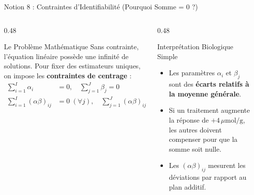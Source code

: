 \documentclass[aspectratio=169,10pt]{beamer}
\begin{document}
\begin{frame}{Notion 8 : Contraintes d'Identifiabilité (Pourquoi Somme = 0 ?)}
  \begin{columns}[onlytextwidth, T]
    \begin{column}{0.48\linewidth}
      \begin{conceptbox}{Le Problème Mathématique}
        Sans contrainte, l'équation linéaire possède une infinité de solutions. Pour fixer des estimateurs uniques, on impose les \textbf{contraintes de centrage} :
        \begin{align*}
          \sum_{i=1}^I \alpha_i &= 0, \quad \sum_{j=1}^J \beta_j = 0 \\
          \sum_{i=1}^I (\alpha\beta)_{ij} &= 0 \; (\forall j), \quad \sum_{j=1}^J (\alpha\beta)_{ij} = 0 \; (\forall i)
        \end{align*}
      \end{conceptbox}
    \end{column}
    \begin{column}{0.48\linewidth}
      \begin{biobox}{Interprétation Biologique Simple}
        \begin{itemize}
          \item Les paramètres $\alpha_i$ et $\beta_j$ sont des \textbf{écarts relatifs à la moyenne générale}.
          \item Si un traitement augmente la réponse de $+4\,\mu\text{mol/g}$, les autres doivent compenser pour que la somme soit nulle.
          \item Les $(\alpha\beta)_{ij}$ mesurent les déviations par rapport au plan additif.
        \end{itemize}
      \end{biobox}
    \end{column}
  \end{columns}
\end{frame}
\end{document}
